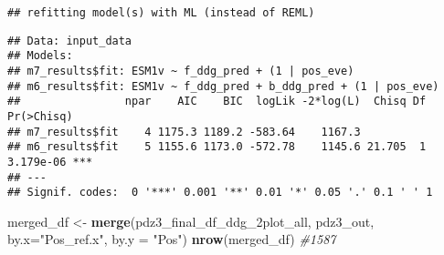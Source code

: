 \documentclass[
]{article}
\newenvironment{Shaded}{\begin{snugshade}}{\end{snugshade}}
\newcommand{\AttributeTok}[1]{\textcolor[rgb]{0.13,0.29,0.53}{#1}}
\newcommand{\CommentTok}[1]{\textcolor[rgb]{0.56,0.35,0.01}{\textit{#1}}}
\newcommand{\FunctionTok}[1]{\textcolor[rgb]{0.13,0.29,0.53}{\textbf{#1}}}
\newcommand{\NormalTok}[1]{#1}
\newcommand{\OtherTok}[1]{\textcolor[rgb]{0.56,0.35,0.01}{#1}}
\newcommand{\SpecialCharTok}[1]{\textcolor[rgb]{0.81,0.36,0.00}{\textbf{#1}}}
\newcommand{\StringTok}[1]{\textcolor[rgb]{0.31,0.60,0.02}{#1}}
\begin{document}
\begin{Shaded}
\end{Shaded}

\begin{verbatim}
## refitting model(s) with ML (instead of REML)
\end{verbatim}

\begin{verbatim}
## Data: input_data
## Models:
## m7_results$fit: ESM1v ~ f_ddg_pred + (1 | pos_eve)
## m6_results$fit: ESM1v ~ f_ddg_pred + b_ddg_pred + (1 | pos_eve)
##                npar    AIC    BIC  logLik -2*log(L)  Chisq Df Pr(>Chisq)    
## m7_results$fit    4 1175.3 1189.2 -583.64    1167.3                         
## m6_results$fit    5 1155.6 1173.0 -572.78    1145.6 21.705  1  3.179e-06 ***
## ---
## Signif. codes:  0 '***' 0.001 '**' 0.01 '*' 0.05 '.' 0.1 ' ' 1
\end{verbatim}

\begin{Shaded}
\end{Shaded}

\begin{Shaded}
\begin{Highlighting}[]
\NormalTok{merged\_df }\OtherTok{\textless{}{-}} \FunctionTok{merge}\NormalTok{(pdz3\_final\_df\_ddg\_2plot\_all, pdz3\_out, }\AttributeTok{by.x=}\StringTok{"Pos\_ref.x"}\NormalTok{, }\AttributeTok{by.y =} \StringTok{"Pos"}\NormalTok{)}
\FunctionTok{nrow}\NormalTok{(merged\_df) }\CommentTok{\#1587}
\end{Highlighting}
\end{Shaded}
\end{document}
